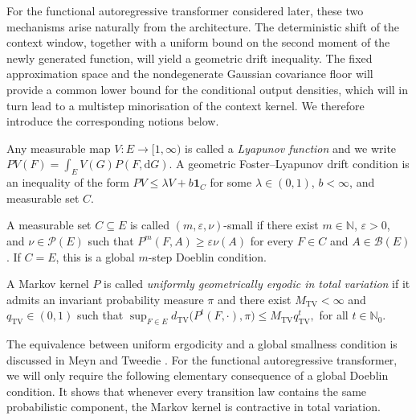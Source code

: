 For the functional autoregressive transformer considered later, these two mechanisms arise naturally from the architecture. The deterministic shift of the context window, together with a uniform bound on the second moment of the newly generated function, will yield a geometric drift inequality. The fixed approximation space and the nondegenerate Gaussian covariance floor will provide a common lower bound for the conditional output densities, which will in turn lead to a multistep minorisation of the context kernel. We therefore introduce the corresponding notions below.

\begin{definition}\label{def:Lyapunov function and drift}
Any measurable map \(V:E\to[1,\infty)\) is called a \emph{Lyapunov function} and we write
\(
PV(F)=\int_EV(G)P(F,\mathrm dG).
\)
A geometric Foster--Lyapunov drift condition is an inequality of the form
\(
PV\leqslant\lambda V+b\mathbf 1_C
\)
for some \(\lambda\in(0,1)\), \(b<\infty\), and measurable set \(C\).
\end{definition}

\begin{definition}\label{def:Small set and minorisation}
A measurable set \(C\subseteq E\) is called \((m,\varepsilon,\nu)\)-small if there exist \(m\in\mathbb N\), \(\varepsilon>0\), and \(\nu\in\mathcal P(E)\) such that
\(
P^m(F,A)\geqslant\varepsilon\nu(A)
\)
for every \(F\in C\) and \(A\in\mathcal B(E)\). If \(C=E\), this is a global \(m\)-step Doeblin condition.
\end{definition}

\begin{definition}\label{def:Uniform geometric ergodicity}
A Markov kernel \(P\) is called \emph{uniformly geometrically ergodic in total variation} if it admits an invariant probability measure \(\pi\) and there exist \(M_{\mathrm{TV}}<\infty\) and \(q_{\mathrm{TV}}\in(0,1)\) such that
\(
\sup_{F\in E}d_{\mathrm{TV}}\bigl(P^t(F,\cdot),\pi\bigr)\leqslant M_{\mathrm{TV}}q_{\mathrm{TV}}^t,\)
for all \(t\in\mathbb N_0.
\)
\end{definition}

The equivalence between uniform ergodicity and a global smallness condition is discussed in Meyn and Tweedie \cite[Theorem~16.0.2]{MeynTweedie2009}. For the functional autoregressive transformer, we will only require the following elementary consequence of a global Doeblin condition. It shows that whenever every transition law contains the same probabilistic component, the Markov kernel is contractive in total variation.

